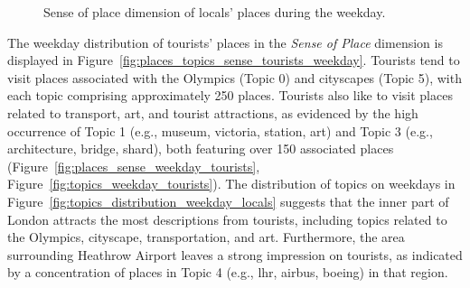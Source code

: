 \documentclass{article}
\theoremstyle{remark}
\begin{document}
\begin{figure}[!h]
    \caption{Sense of place dimension of locals' places during the weekday.}
    \label{fig:places_topics_sense_locals_weekday}
\end{figure}

The weekday distribution of tourists' places in the \textit{Sense of Place} dimension is displayed in Figure~\ref{fig:places_topics_sense_tourists_weekday}. Tourists tend to visit places associated with the Olympics (Topic 0) and cityscapes (Topic 5), with each topic comprising approximately 250 places. Tourists also like to visit places related to transport, art, and tourist attractions, as evidenced by the high occurrence of Topic 1 (e.g., museum, victoria, station, art) and Topic 3 (e.g., architecture, bridge, shard), both featuring over 150 associated places (Figure~\ref{fig:places_sense_weekday_tourists}, Figure~\ref{fig:topics_weekday_tourists}). The distribution of topics on weekdays in Figure~\ref{fig:topics_distribution_weekday_locals} suggests that the inner part of London attracts the most descriptions from tourists, including topics related to the Olympics, cityscape, transportation, and art. Furthermore, the area surrounding Heathrow Airport leaves a strong impression on tourists, as indicated by a concentration of places in Topic 4 (e.g., lhr, airbus, boeing) in that region.
\end{document}
